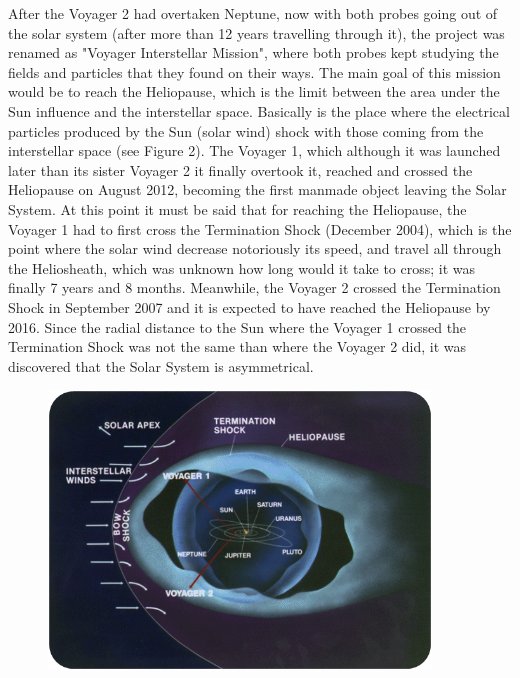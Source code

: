 \documentclass[11pt,a4paper]{article}
\begin{document}
After the Voyager 2 had overtaken Neptune, now with both probes going out of the solar system (after more than 12 years travelling through it), the project was renamed as "Voyager Interstellar Mission", where both probes kept studying the fields and particles that they found on their ways. The main goal of this mission would be to reach the Heliopause, which is the limit between the area under the Sun influence and the interstellar space. Basically is the place where the electrical particles produced by the Sun (solar wind) shock with those coming from the interstellar space (see Figure 2). The Voyager 1, which although it was launched later than its sister Voyager 2 it finally overtook it, reached and crossed the Heliopause on August 2012, becoming the first manmade object leaving the Solar System. At this point it must be said that for reaching the Heliopause, the Voyager 1 had to first cross the Termination Shock (December 2004), which is the point where the solar wind decrease notoriously its speed, and travel all through the Heliosheath, which was unknown how long would it take to cross; it was finally 7 years and 8 months. Meanwhile, the Voyager 2 crossed the Termination Shock in September 2007 and it is expected to have reached the Heliopause by 2016. Since the radial distance to the Sun where the Voyager 1 crossed the Termination Shock was not the same than where the Voyager 2 did, it was discovered that the Solar System is asymmetrical.
\\
\begin{figure}[hb]
  \centering
  \includegraphics[width=4in]{./heliosphere}
  \caption{}
\end{figure}
\end{document}
